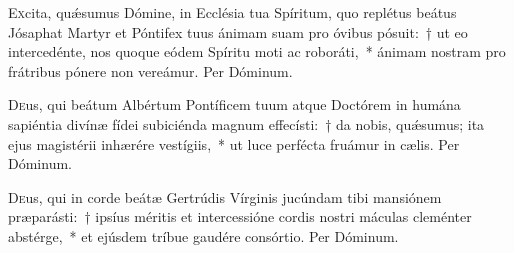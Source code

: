\documentclass[vesperale_romanum]{subfiles}
\begin{document}
\vespsequentiscomm

\myrule


\duplex

\oratio

\lettrine{E}{x}cita, quǽsumus Dómine, in Ecclésia tua Spíritum, quo replétus beátus Jósaphat Martyr et Póntifex tuus ánimam suam pro óvibus pósuit:~† ut eo intercedénte, nos quoque eódem Spíritu moti ac roboráti,~* ánimam nostram pro frátribus pónere non vereámur. Per Dóminum.


\capitdeseq

\myrule


\duplex



\oratio

\lettrine{D}{e}us, qui beátum Albértum Pontíficem tuum atque Doctórem in humána sapiéntia divínæ fídei subiciénda magnum effecísti:~† da nobis, quǽsumus; ita ejus magistérii inhærére vestígiis,~* ut luce perfécta fruámur in cælis. Per Dóminum.

\capitdeseq

\myrule


\duplex

\oratio

\lettrine{D}{e}us, qui in corde beátæ Gertrúdis Vírginis jucúndam tibi mansiónem præparásti:~† ipsíus méritis et intercessióne cordis nostri máculas cleménter abstérge,~* et ejúsdem tríbue gaudére consórtio. Per Dóminum.

\end{document}
